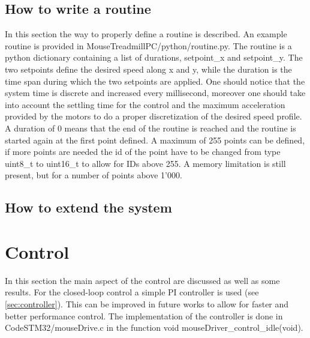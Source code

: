 \documentclass[12pt,a4paper]{article}
\begin{document}
\subsection{How to write a routine}
In this section the way to properly define a routine is described. 
An example routine is provided in MouseTreadmillPC/python/routine.py. The routine is a python dictionary containing a list of durations, setpoint\_x and setpoint\_y. The two setpoints define the desired speed along x and y, while the duration is the time span during which the two setpoints are applied. One should notice that the system time is discrete and increased every millisecond, moreover one should take into account the settling time for the control and the maximum acceleration provided by the motors to do a proper discretization of the desired speed profile.\\
A duration of 0 means that the end of the routine is reached and the routine is started again at the first point defined. A maximum of 255 points can be defined, if more points are needed the id of the point have to be changed from type uint8\_t to uint16\_t to allow for IDs above 255. A memory limitation is still present, but for a number of points above 1'000.
\subsection{How to extend the system}

\section{Control} \label{sec:control}
In this section the main aspect of the control are discussed as well as some results.
For the closed-loop control a simple PI controller is used (see \ref{sec:controller}). This can be improved in future works to allow for faster and better performance control. The implementation of the controller is done in CodeSTM32/mouseDrive.c in the function void mouseDriver\_control\_idle(void). 
\end{document}
